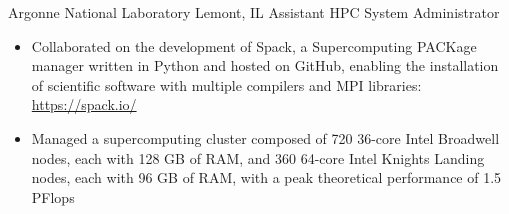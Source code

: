 
        {Argonne National Laboratory}
        {Lemont, IL}
        {Assistant HPC System Administrator}
        {}{
    \begin{itemize}
        \item Collaborated on the development of Spack, a Supercomputing PACKage manager written in Python and hosted on GitHub, enabling the installation of scientific software with multiple compilers and MPI libraries: \url{https://spack.io/}
        \item Managed a supercomputing cluster composed of 720 36-core Intel Broadwell nodes, each with 128 GB of RAM, and 360 64-core Intel Knights Landing nodes, each with 96 GB of RAM, with a peak theoretical performance of 1.5 PFlops
    \end{itemize}
}

